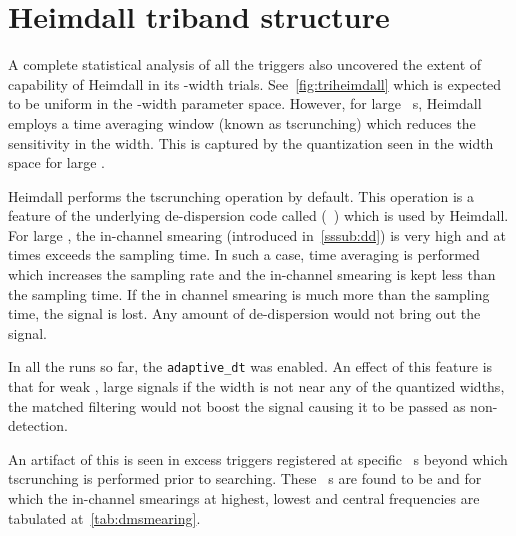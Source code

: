 \section {Heimdall triband structure}
\label{sec:htriband}
\par A complete statistical analysis of all the triggers also uncovered the extent of capability of Heimdall in its \dm-width trials.
See~\autoref{fig:triheimdall} which is expected to be uniform in the \dm-width parameter space. 
However, for large \dm~s, Heimdall employs a time averaging window (known as tscrunching) which reduces the sensitivity in the width. 
This is captured by the quantization seen in the width space for large \dm.

\par Heimdall performs the tscrunching operation by default. 
This operation is a feature of the underlying de-dispersion code called (~\cite{dedisp}) which is used by Heimdall. 
For large \dm, the in-channel smearing (introduced in~\autoref{sssub:dd}) is very high and at times exceeds the sampling time. In such a case, time averaging is performed which increases the sampling rate and the in-channel smearing is kept less than the sampling time.
If the in channel smearing is much more than the sampling time, the signal is lost. Any amount of de-dispersion would not bring out the signal.

\par In all the runs so far, the \texttt{adaptive\_dt} was enabled. 
An effect of this feature is that for weak \sn, large \dm signals if the width is not near any of the quantized widths, the matched filtering would not boost the signal causing it to be passed as non-detection.

\par An artifact of this is seen in excess triggers registered at specific \dm~s beyond which tscrunching is performed prior to searching.
These \dm~s are found to be  and  for which the in-channel smearings at highest, lowest and central frequencies are tabulated at~\autoref{tab:dmsmearing}.

